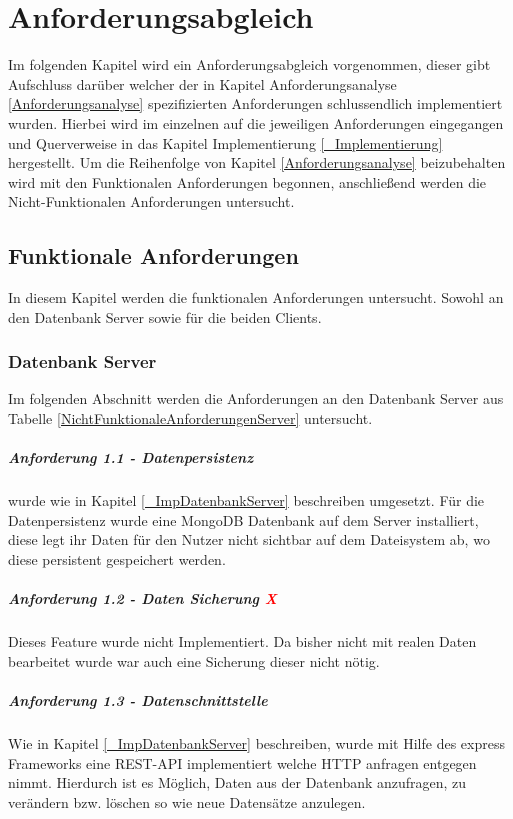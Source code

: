 \chapter{Anforderungsabgleich} \label{Anforderungsabgleich} 
Im folgenden Kapitel wird ein Anforderungsabgleich vorgenommen, dieser gibt Aufschluss darüber welcher der in Kapitel Anforderungsanalyse \ref{Anforderungsanalyse} spezifizierten Anforderungen schlussendlich implementiert wurden.
Hierbei wird im einzelnen auf die jeweiligen Anforderungen eingegangen und Querverweise in das Kapitel Implementierung \ref{_Implementierung} hergestellt. Um die Reihenfolge von Kapitel \ref{Anforderungsanalyse} beizubehalten wird mit den Funktionalen Anforderungen begonnen, anschließend werden die Nicht-Funktionalen Anforderungen untersucht.
\section{Funktionale Anforderungen}
In diesem Kapitel werden die funktionalen Anforderungen untersucht. Sowohl an den Datenbank Server sowie für die beiden Clients.
\subsection{Datenbank Server}
Im folgenden Abschnitt werden die Anforderungen an den Datenbank Server aus Tabelle \ref{NichtFunktionaleAnforderungenServer} untersucht.
\paragraph{Anforderung 1.1 - Datenpersistenz  \textcolor{green}{\checkmark}}
 wurde wie in Kapitel \ref{_ImpDatenbankServer} beschreiben umgesetzt. Für die Datenpersistenz wurde eine MongoDB Datenbank auf dem Server installiert, diese legt ihr Daten für den Nutzer nicht sichtbar auf dem Dateisystem ab, wo diese persistent gespeichert werden.

\paragraph{Anforderung 1.2 - Daten Sicherung  \textcolor{red}{X}}
Dieses Feature wurde nicht Implementiert. Da bisher nicht mit realen Daten bearbeitet wurde war auch eine Sicherung dieser nicht nötig.

\paragraph{Anforderung 1.3 - Datenschnittstelle \textcolor{green}{\checkmark}}
Wie in Kapitel \ref{_ImpDatenbankServer} beschreiben, wurde mit Hilfe des express Frameworks eine REST-API implementiert welche HTTP anfragen entgegen nimmt. Hierdurch ist es Möglich, Daten aus der Datenbank anzufragen, zu verändern bzw. löschen so wie neue Datensätze anzulegen.


